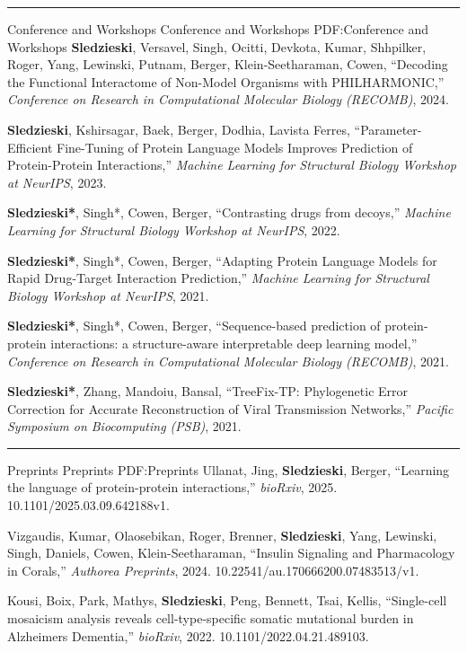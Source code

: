 \documentclass[letterpaper,MMMyyyy,nonstopmode]{simpleresumecv}
\begin{document}
\begin{Body}
\BigGap
\hrule
\Section
{Conference and Workshops}
{Conference and Workshops}
{PDF:Conference and Workshops}
\Gap
\NumberedItem{[6]}
{{\textbf{Sledzieski}, Versavel, Singh, Ocitti, Devkota, Kumar, Shhpilker, Roger, Yang, Lewinski, Putnam, Berger, Klein-Seetharaman, Cowen}, 
``Decoding the Functional Interactome of Non-Model Organisms with PHILHARMONIC,'' 
\textit{Conference on Research in Computational Molecular Biology (RECOMB)}, 2024.
}

\Gap
\NumberedItem{[5]}
{{\textbf{Sledzieski}, Kshirsagar, Baek, Berger, Dodhia, Lavista Ferres}, 
``Parameter-Efficient Fine-Tuning of Protein Language Models Improves Prediction of Protein-Protein Interactions,'' 
\textit{Machine Learning for Structural Biology Workshop at NeurIPS}, 2023.
}

\Gap
\NumberedItem{[4]}
{{\textbf{Sledzieski*}, Singh*, Cowen, Berger}, 
``Contrasting drugs from decoys,'' 
\textit{Machine Learning for Structural Biology Workshop at NeurIPS}, 2022.
}

\Gap
\NumberedItem{[3]}
{{\textbf{Sledzieski*}, Singh*, Cowen, Berger}, 
``Adapting Protein Language Models for Rapid Drug-Target Interaction Prediction,'' 
\textit{Machine Learning for Structural Biology Workshop at NeurIPS}, 2021.
}

\Gap
\NumberedItem{[2]}
{{\textbf{Sledzieski*}, Singh*, Cowen, Berger}, 
``Sequence-based prediction of protein-protein interactions: a structure-aware interpretable deep learning model,'' 
\textit{Conference on Research in Computational Molecular Biology (RECOMB)}, 2021.
}

\Gap
\NumberedItem{[1]}
{{\textbf{Sledzieski*}, Zhang, Mandoiu, Bansal}, 
``TreeFix-TP: Phylogenetic Error Correction for Accurate Reconstruction of Viral Transmission Networks,'' 
\textit{Pacific Symposium on Biocomputing (PSB)}, 2021.
}


\BigGap
\hrule
\Section
{Preprints}
{Preprints}
{PDF:Preprints}
\Gap
\NumberedItem{[3]}
{{Ullanat, Jing, \textbf{Sledzieski}, Berger}, 
``Learning the language of protein-protein interactions,'' 
\textit{bioRxiv}, 2025. 10.1101/2025.03.09.642188v1.
}

\Gap
\NumberedItem{[2]}
{{Vizgaudis, Kumar, Olaosebikan, Roger, Brenner, \textbf{Sledzieski}, Yang, Lewinski, Singh, Daniels, Cowen, Klein-Seetharaman}, 
``Insulin Signaling and Pharmacology in Corals,'' 
\textit{Authorea Preprints}, 2024. 10.22541/au.170666200.07483513/v1.
}

\Gap
\NumberedItem{[1]}
{{Kousi, Boix, Park, Mathys, \textbf{Sledzieski}, Peng, Bennett, Tsai, Kellis}, 
``Single-cell mosaicism analysis reveals cell-type-specific somatic mutational burden in Alzheimers Dementia,'' 
\textit{bioRxiv}, 2022. 10.1101/2022.04.21.489103.
}




\end{Body}
\end{document}
